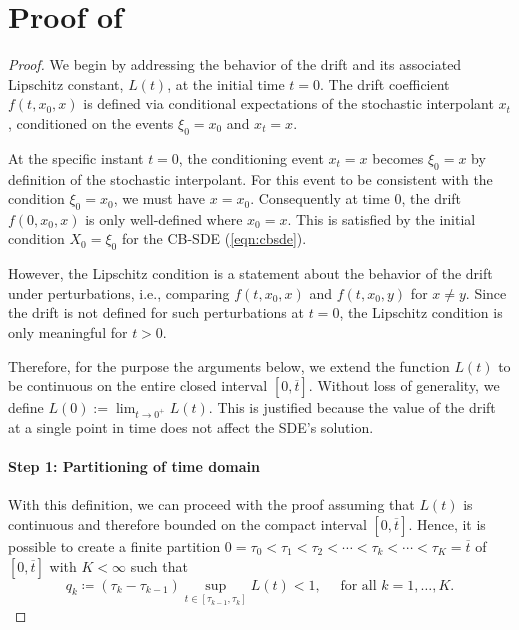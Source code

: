 \section{Proof of } \label{prf:thm:exist}
\restatethmexist*
\begin{proof}
  We begin by addressing the behavior of the drift and its associated Lipschitz constant, \(L(t)\), at the initial time \(t = 0\). The drift coefficient \(f(t, x_{0}, x)\) is defined via conditional expectations of the stochastic interpolant \(x_{t}\), conditioned on the events \(\xi_{0} = x_{0}\) and \(x_{t} = x\).

  At the specific instant \(t = 0\), the conditioning event \(x_{t} = x\) becomes \(\xi_{0} = x\) by definition of the stochastic interpolant. For this event to be consistent with the condition \(\xi_{0} = x_{0}\), we must have \(x = x_{0}\). Consequently at time \(0\), the drift \(f(0, x_{0}, x)\) is only well-defined where \(x_{0} = x\). This is satisfied by the initial condition \(X_{0} = \xi_{0}\) for the CB-SDE (\ref{eqn:cbsde}).

  However, the Lipschitz condition is a statement about the behavior of the drift under perturbations, i.e., comparing \(f(t, x_0, x)\) and \(f(t, x_{0}, y)\) for \(x \neq y\). Since the drift is not defined for such perturbations at \(t = 0\), the Lipschitz condition is only meaningful for \(t > 0\).

  Therefore, for the purpose the arguments below, we  extend the function \(L(t)\) to be continuous on the entire closed interval \([0, \overline{t}]\). Without loss of generality, we define \(L(0) := \lim_{t \to 0^{+}} L(t)\). This is justified because the value of the drift at a single point in time does not affect the SDE's solution.
  \paragraph{Step 1: Partitioning of time domain}

  With this definition, we can proceed with the proof assuming that \(L(t)\) is continuous and therefore bounded on the compact interval \([0, \overline{t}]\). Hence, it is possible to create a finite partition \(0 = \tau_{0} < \tau_{1} < \tau_{2} < \cdots < \tau_{k} < \cdots < \tau_{K} = {\overline{t}}\) of \([0, {\overline{t}}]\) with \(K < \infty\) such that
  \[
    q_{k} \coloneqq (\tau_{k} - \tau_{k-1}) \sup_{t \in [\tau_{k-1}, \tau_{k}]} {L}(t) < 1, \quad \text{ for all } k = 1, \ldots, K.
  \]


\end{proof}
